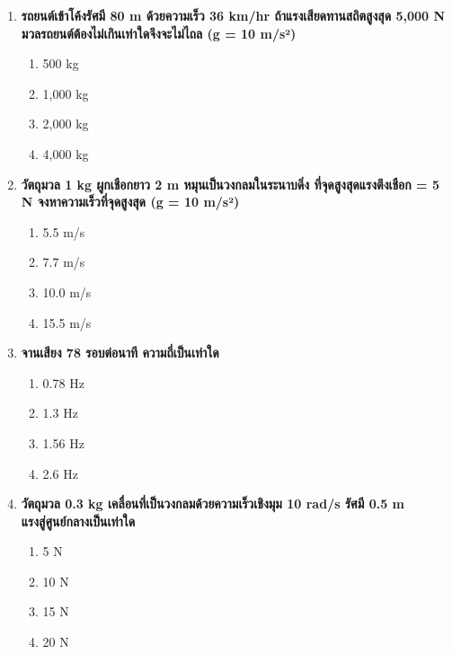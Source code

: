 \documentclass[12pt]{article}
\begin{document}
\begin{enumerate}
\begin{enumerate}[label=\alph*)]
\item 0.5π s
\item π s
\item 2π s
\end{enumerate}
\item \textbf{รถยนต์เข้าโค้งรัศมี 80 m ด้วยความเร็ว 36 km/hr ถ้าแรงเสียดทานสถิตสูงสุด 5,000 N มวลรถยนต์ต้องไม่เกินเท่าใดจึงจะไม่ไถล (g = 10 m/s²)}
\begin{enumerate}[label=\alph*)]
\item 500 kg
\item 1,000 kg
\item 2,000 kg
\item 4,000 kg
\end{enumerate}
\item \textbf{วัตถุมวล 1 kg ผูกเชือกยาว 2 m หมุนเป็นวงกลมในระนาบดิ่ง ที่จุดสูงสุดแรงตึงเชือก = 5 N จงหาความเร็วที่จุดสูงสุด (g = 10 m/s²)}
\begin{enumerate}[label=\alph*)]
\item 5.5 m/s
\item 7.7 m/s
\item 10.0 m/s
\item 15.5 m/s
\end{enumerate}
\item \textbf{จานเสียง 78 รอบต่อนาที ความถี่เป็นเท่าใด}
\begin{enumerate}[label=\alph*)]
\item 0.78 Hz
\item 1.3 Hz
\item 1.56 Hz
\item 2.6 Hz
\end{enumerate}
\item \textbf{วัตถุมวล 0.3 kg เคลื่อนที่เป็นวงกลมด้วยความเร็วเชิงมุม 10 rad/s รัศมี 0.5 m แรงสู่ศูนย์กลางเป็นเท่าใด}
\begin{enumerate}[label=\alph*)]
\item 5 N
\item 10 N
\item 15 N
\item 20 N
\end{enumerate}
\end{enumerate}
\end{document}
